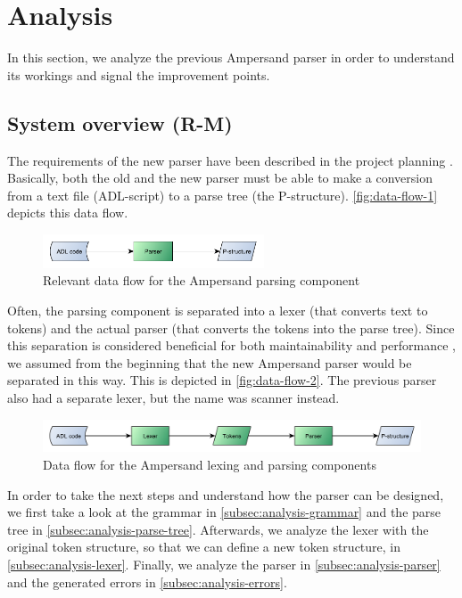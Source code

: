 
\section{Analysis}
\label{sec:analysis}
In this section, we analyze the previous Ampersand parser in order to understand its workings and signal the improvement points.

\subsection{System overview (R-M)}
The requirements of the new parser have been described in the project planning .
Basically, both the old and the new parser must be able to make a conversion from a text file (ADL-script) to a parse tree (the P-structure).
\autoref{fig:data-flow-1} depicts this data flow.
%
\begin{figure}[htb!]
	\centering
	\includegraphics[width=0.586\textwidth]{Figures/DataFlow1}
	\caption{Relevant data flow for the Ampersand parsing component}
	\label{fig:data-flow-1}
\end{figure}

Often, the parsing component is separated into a lexer (that converts text to tokens) and the actual parser (that converts the tokens into the parse tree).
Since this separation is considered beneficial for both maintainability and performance , we assumed from the beginning that the new Ampersand parser would be separated in this way.
This is depicted in \autoref{fig:data-flow-2}.
The previous parser also had a separate lexer, but the name was scanner instead.
%
\begin{figure}[htb!]
	\centering
	\includegraphics[width=1\textwidth]{Figures/DataFlow2}
	\caption{Data flow for the Ampersand lexing and parsing components}
	\label{fig:data-flow-2}
\end{figure}

In order to take the next steps and understand how the parser can be designed, we first take a look at the grammar in \autoref{subsec:analysis-grammar} and the parse tree in \autoref{subsec:analysis-parse-tree}.
Afterwards, we analyze the lexer with the original token structure, so that we can define a new token structure, in \autoref{subsec:analysis-lexer}.
Finally, we analyze the parser in \autoref{subsec:analysis-parser} and the generated errors in \autoref{subsec:analysis-errors}.

